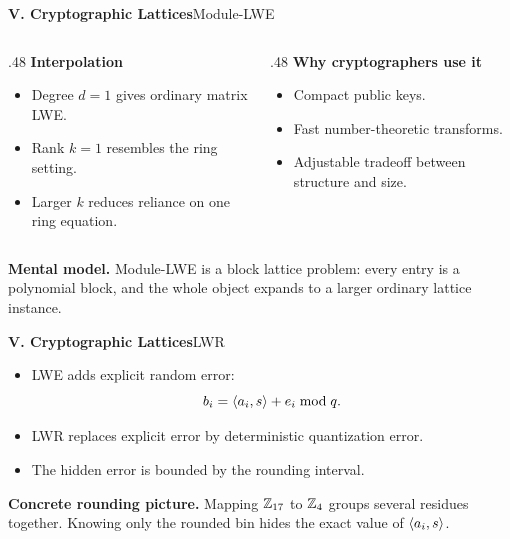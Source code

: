 \begin{frame}[shrink=7]{\textbf{V. Cryptographic Lattices}}{Module-LWE}
\begin{columns}[T,onlytextwidth]
\begin{column}{.48\textwidth}
\textcolor{TealDarkCyan}{\textbf{Interpolation}}
\begin{itemize}
  \item Degree $d=1$ gives ordinary matrix LWE.
  \item Rank $k=1$ resembles the ring setting.
  \item Larger $k$ reduces reliance on one ring equation.
\end{itemize}
\end{column}
\begin{column}{.48\textwidth}
\textcolor{TealDarkCyan}{\textbf{Why cryptographers use it}}
\begin{itemize}
  \item Compact public keys.
  \item Fast number-theoretic transforms.
  \item Adjustable tradeoff between structure and size.
\end{itemize}
\end{column}
\end{columns}
\textbf{Mental model.}\; Module-LWE is a block lattice problem: every entry is a polynomial block, and the whole object expands to a larger ordinary lattice instance.
\end{frame}

\begin{frame}[shrink=8]{\textbf{V. Cryptographic Lattices}}{LWR}
\begin{itemize}
  \item LWE adds explicit random error:
  \[
    b_i=\left\langle a_i,s\right\rangle+e_i\bmod q.
  \]
  \item LWR replaces explicit error by deterministic quantization error.
  \item The hidden error is bounded by the rounding interval.
\end{itemize}
\textbf{Concrete rounding picture.}\; Mapping $\mathbb{Z}_{17}$ to $\mathbb{Z}_4$ groups several residues together.
Knowing only the rounded bin hides the exact value of $\left\langle a_i,s\right\rangle$.
\end{frame}


